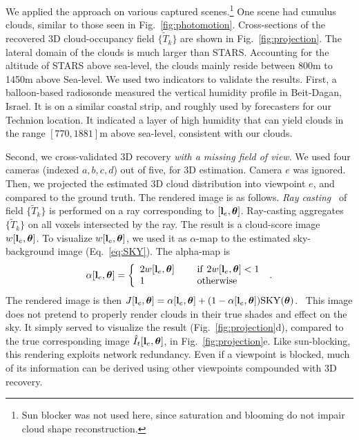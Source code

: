 \documentclass[runningheads]{llncs}
\begin{document}
We applied the approach on various captured scenes.\footnote{Sun blocker was not used here, since saturation and blooming do not impair cloud shape reconstruction.} One scene had cumulus clouds, similar to those seen in Fig.~\ref{fig:photomotion}.
Cross-sections of the recovered 3D cloud-occupancy field $\{\tilde T_k\}$ are shown in Fig.~\ref{fig:projection}. The lateral domain of the clouds is much larger than STARS.
Accounting for the altitude of STARS above sea-level, the clouds mainly reside between 800m to 1450m above Sea-level. We used two indicators to validate the results. First, a balloon-based radiosonde measured the vertical humidity profile in Beit-Dagan, Israel. It is on a similar coastal strip, and roughly used by forecasters for our Technion location. It indicated a layer of high humidity that can yield clouds in the range $[770,1881]$m above sea-level, consistent with our clouds.

Second, we cross-validated 3D recovery {\em with a missing field of view}. We used four cameras (indexed $a,b,c,d$) out of five, for 3D estimation. Camera $e$ was ignored. Then, we projected the estimated 3D cloud distribution into viewpoint $e$, and compared to the ground truth. The rendered image is as follows. {\em Ray casting}~\cite{Levoy1990} of  field $\{\tilde T_k\}$ is performed on a ray corresponding to
$[{\bf l}_e,{\bm \theta}]$. Ray-casting aggregates $\{\tilde T_k\}$ on all voxels intersected by the ray. The result is a cloud-score image $w[{\bf l}_e,{\bm \theta}]$.
To visualize $w[{\bf l}_e,{\bm \theta}]$, we used it as $\alpha$-map to the estimated sky-background image (Eq.~\ref{eq:SKY}). The alpha-map is
\begin{equation}
 \alpha[{\bf l}_e,{\bm \theta}]=\left\{
      \begin{array}{ll}
      2w[{\bf l}_e,{\bm \theta}]
      & ~~~~{\rm if}~ 2w[{\bf l}_e,{\bm \theta}]<1 \\
      1
      & ~~~~{\rm otherwise}
      \end{array}
      \right.
  \;.
 \label{eq:alpha}
\end{equation}
The rendered image is then
 $J[{\bf l}_e,{\bm \theta}]=
 \alpha[{\bf l}_e,{\bm \theta}]+(1-\alpha[{\bf l}_e,{\bm \theta}]){\rm SKY}({\bm \theta})$.~
This image does not pretend to properly render clouds in their true shades and effect on the sky. It simply served to visualize the result (Fig.~\ref{fig:projection}d), compared to the true corresponding image $\hat I_t[{\bf l}_e,{\bm \theta}]$, in Fig.~\ref{fig:projection}e.
Like sun-blocking, this rendering exploits network redundancy. Even if a viewpoint is blocked, much of its information can be derived using other viewpoints compounded with 3D recovery.
\end{document}
